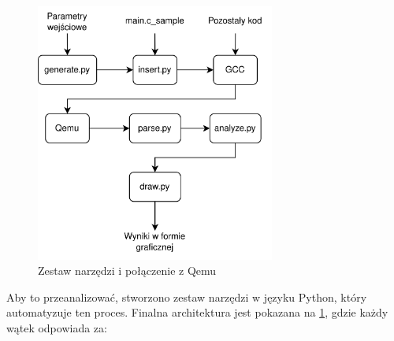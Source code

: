 \documentclass[../../main]{subfiles}
\begin{document}
\begin{figure}[ht]
    \centering
    \includegraphics[width=0.7\textwidth]{Images/generate-parse-analyze.png}
    \caption{Zestaw narzędzi i połączenie z Qemu}
    \label{fig:generate-parse-analyze}
\end{figure}

Aby to przeanalizować, stworzono zestaw narzędzi w języku Python, który automatyzuje ten proces. Finalna architektura jest pokazana na \cref{fig:generate-parse-analyze}, gdzie każdy wątek odpowiada za:
\end{document}
